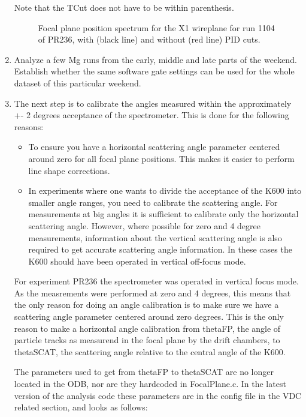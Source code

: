 \documentclass[11pt]{report}
\begin{document}
\begin{enumerate}
Note that the TCut does not have to be within parenthesis.

\begin{figure}[]
\centerline{\vspace{0cm}\hspace{0cm}
}
\centering
\caption{Focal plane position spectrum for the X1 wireplane for run 1104 of PR236, with (black line) and 
without (red line) PID cuts.}
\label{fig:xposrun1104}
\end{figure} 


\item Analyze a few Mg runs from the early, middle and late parts of the weekend. Establish whether the same software gate settings can be used for the whole dataset of this particular weekend.




\item The next step is to calibrate the angles measured within the approximately +- 2 degrees
acceptance of the spectrometer. This is done for the following reasons:
\begin{itemize}
\item To ensure you have a horizontal scattering angle parameter centered around zero for
all focal plane positions. This makes it easier to perform line shape corrections.
\item In experiments where one wants to divide the acceptance of the K600 into smaller
angle ranges, you need to calibrate the scattering angle. For measurements at big angles
it is sufficient to calibrate only the horizontal scattering angle.  However, where possible
for zero and 4 degree measurements, information about the vertical scattering angle is
also required to get accurate scattering angle information. In these cases the K600 should have been
operated in vertical off-focus mode.
\end{itemize}

For experiment PR236 the spectrometer was operated in vertical focus mode. As the measrements
were performed at zero and 4 degrees, this means that the only reason for doing an angle
calibration is to make sure we have a scattering angle parameter centered around zero degrees.
This is the only reason to make a horizontal angle calibration from thetaFP,
the angle of particle tracks as measurend in the focal plane by the drift chambers,
to thetaSCAT, the scattering angle relative to the central angle of the K600. 

The parameters used to get from thetaFP to thetaSCAT 
are no longer located in the ODB, nor are they hardcoded in FocalPlane.c. 
In the latest version of the analysis code
these parameters are in the config file in the VDC related section, and looks as follows:


\end{enumerate}
\end{document}
